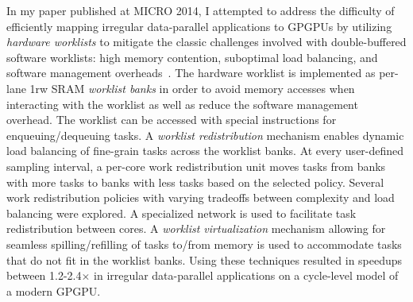 In my paper published at MICRO 2014, I attempted to address the
difficulty of efficiently mapping irregular data-parallel applications to
GPGPUs by utilizing \emph{hardware worklists} to mitigate the classic
challenges involved with double-buffered software worklists: high memory
contention, suboptimal load balancing, and software management
overheads~\cite{kim-hwwl-micro2014}. The hardware worklist is implemented
as per-lane 1rw SRAM \emph{worklist banks} in order to avoid memory
accesses when interacting with the worklist as well as reduce the
software management overhead. The worklist can be accessed with special
instructions for enqueuing/dequeuing tasks. A \emph{worklist
  redistribution} mechanism enables dynamic load balancing of fine-grain
tasks across the worklist banks. At every user-defined sampling interval,
a per-core work redistribution unit moves tasks from banks with more
tasks to banks with less tasks based on the selected policy. Several work
redistribution policies with varying tradeoffs between complexity and
load balancing were explored. A specialized network is used to facilitate
task redistribution between cores.  A \emph{worklist virtualization}
mechanism allowing for seamless spilling/refilling of tasks to/from
memory is used to accommodate tasks that do not fit in the worklist
banks. Using these techniques resulted in speedups between
1.2-2.4$\times$ in irregular data-parallel applications on a cycle-level
model of a modern GPGPU.
